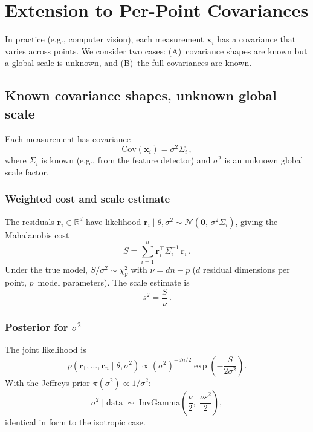 \documentclass[11pt]{article}
\newcommand{\Normal}{\mathcal{N}}
\newcommand{\data}{\mathrm{data}}
\newcommand{\InvGamma}{\mathrm{InvGamma}}
\begin{document}
\section{Extension to Per-Point Covariances}
\label{sec:heteroscedastic}

In practice (e.g., computer vision), each measurement $\mathbf{x}_i$
has a covariance that varies across points. We consider two cases:
(A)~covariance shapes are known but a global scale is unknown, and
(B)~the full covariances are known.

\subsection{Known covariance shapes, unknown global scale}
\label{sec:het-unknown}

Each measurement has covariance
\begin{equation}
  \mathrm{Cov}(\mathbf{x}_i) = \sigma^2 \Sigma_i\,,
\end{equation}
where $\Sigma_i$ is known (e.g., from the feature detector) and
$\sigma^2$ is an unknown global scale factor.

\subsubsection{Weighted cost and scale estimate}

The residuals $\mathbf{r}_i \in \mathbb{R}^d$ have likelihood
$\mathbf{r}_i \mid \theta, \sigma^2 \sim \Normal(\mathbf{0},\, \sigma^2 \Sigma_i)$,
giving the Mahalanobis cost
\begin{equation}
  S = \sum_{i=1}^{n} \mathbf{r}_i^\top \Sigma_i^{-1}\, \mathbf{r}_i\,.
\end{equation}
Under the true model, $S / \sigma^2 \sim \chi^2_\nu$ with
$\nu = dn - p$ ($d$ residual dimensions per point, $p$~model parameters).
The scale estimate is
\begin{equation}
  s^2 = \frac{S}{\nu}\,.
\end{equation}

\subsubsection{Posterior for $\sigma^2$}

The joint likelihood is
\begin{equation}
  p(\mathbf{r}_1, \ldots, \mathbf{r}_n \mid \theta, \sigma^2)
  \propto (\sigma^2)^{-dn/2}
  \exp\!\left(-\frac{S}{2\sigma^2}\right).
\end{equation}
With the Jeffreys prior $\pi(\sigma^2) \propto 1/\sigma^2$:
\begin{equation}
  \sigma^2 \mid \data \;\sim\;
  \InvGamma\!\left(\frac{\nu}{2},\; \frac{\nu s^2}{2}\right),
\end{equation}
identical in form to the isotropic case.
\end{document}
